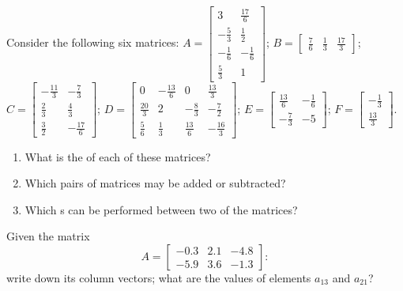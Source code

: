 \begin{OmitV1}
\begin{exercise}  
Consider the following six matrices:
\(A=\begin{bmatrix} 3&\tfrac{17}{6}
\\-\tfrac{5}{3}&\tfrac{1}{2}
\\-\tfrac{1}{6}&-\tfrac{1}{6}
\\\tfrac{5}{3}&1 \end{bmatrix}\);
\(B=\begin{bmatrix} \tfrac{7}{6}&\tfrac{1}{3}&\tfrac{17}{3} \end{bmatrix}\);
\(C=\begin{bmatrix} -\tfrac{11}{3}&-\tfrac{7}{3}
\\\tfrac{2}{3}&\tfrac{4}{3}
\\\tfrac{3}{2}&-\tfrac{17}{6} \end{bmatrix}\);
\(D=\begin{bmatrix} 0&-\tfrac{13}{6}&0&\tfrac{13}{3}
\\\tfrac{20}{3}&2&-\tfrac{8}{3}&-\tfrac{7}{2}
\\\tfrac{5}{6}&\tfrac{1}{3}&\tfrac{13}{6}&-\tfrac{16}{3} \end{bmatrix}\);
\(E=\begin{bmatrix} \tfrac{13}{6}&-\tfrac{1}{6}
\\-\tfrac{7}{3}&-5 \end{bmatrix}\);
\(F=\begin{bmatrix} -\tfrac{1}{3}
\\\tfrac{13}{3} \end{bmatrix}\).
\begin{enumerate}
\item What is the  of each of these matrices?

\item  Which pairs of matrices may be added or subtracted?

\item  Which s can be performed between two of the matrices?

\end{enumerate}
\end{exercise}
\end{OmitV1}


\begin{exercise}  
Given the matrix
\begin{equation*}
A=\begin{bmatrix} -0.3&2.1&-4.8
\\  -5.9&3.6&-1.3 \end{bmatrix}:
\end{equation*}
 write down its column vectors; what are the values of elements \(a_{13}\) and \(a_{21}\)?
\end{exercise}


